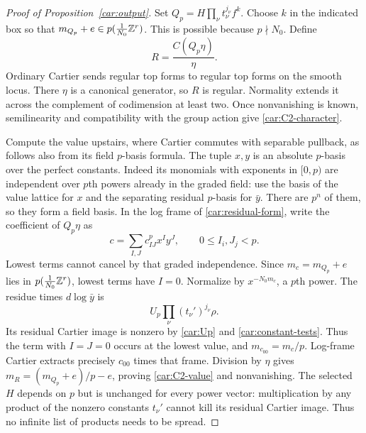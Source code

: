 \begin{proof}[Proof of Proposition~\ref{car:output}]
Set $Q_p=H\prod_\nu t_\nu^{j_\nu}f^k$. Choose $k$ in the indicated
box so that
$m_{Q_p}+e\in p(\frac1{N_0}\mathbb Z^r)$. This is possible because
$p\nmid N_0$. Define
\[
 R=\frac{C(Q_p\eta)}{\eta}.
\]
Ordinary Cartier sends regular top forms to regular top forms
on the smooth locus. There $\eta$ is a canonical generator,
so $R$ is regular. Normality extends it across the complement
of codimension at least two. Once nonvanishing is known,
semilinearity and compatibility with the group action give
\eqref{car:C2-character}.

Compute the value upstairs, where Cartier commutes with
separable pullback, as follows also from its field $p$-basis
formula. The tuple $x,y$ is an absolute $p$-basis over the
perfect constants. Indeed its monomials with exponents in
$[0,p)$ are independent over $p$th powers already in the graded
field: use the basis of the value lattice for $x$ and the
separating residual $p$-basis for $\bar y$. There are $p^n$
of them, so they form a field basis. In the log frame of
\eqref{car:residual-form}, write the coefficient of $Q_p\eta$ as
\[
 c=\sum_{I,J}c_{IJ}^{p}x^I y^J,
 \qquad 0\le I_i,J_j<p.
\]
Lowest terms cannot cancel by that graded independence.
Since $m_c=m_{Q_p}+e$ lies in
$p(\frac1{N_0}\mathbb Z^r)$, lowest terms have $I=0$.
Normalize by $x^{-N_0m_c}$, a $p$th power. The residue times
$d\log\bar y$ is
\[
 U_p\prod_\nu(t_\nu')^{j_\nu}\rho.
\]
Its residual Cartier image is nonzero by \eqref{car:Up} and
\eqref{car:constant-tests}. Thus the term with $I=J=0$ occurs
at the lowest value, and $m_{c_{00}}=m_c/p$. Log-frame Cartier
extracts precisely $c_{00}$ times that frame. Division by
$\eta$ gives
$m_R=(m_{Q_p}+e)/p-e$, proving
\eqref{car:C2-value} and nonvanishing. The selected $H$ depends
on $p$ but is unchanged for every power vector: multiplication
by any product of the nonzero constants $t_\nu'$ cannot kill
its residual Cartier image. Thus no infinite list of products
needs to be spread.


\end{proof}
